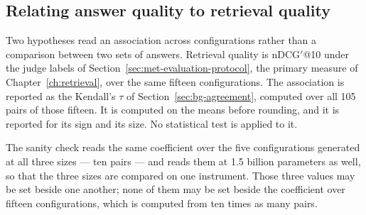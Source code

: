 \subsection*{Relating answer quality to retrieval quality}

Two hypotheses read an association across configurations rather than a comparison between two sets of
answers. Retrieval quality is nDCG$'$@10 under the judge labels of
Section~\ref{sec:met-evaluation-protocol}, the primary measure of Chapter~\ref{ch:retrieval}, over
the same fifteen configurations. The association is reported as the Kendall's $\tau$ of
Section~\ref{sec:bg-agreement}, computed over all 105 pairs of those fifteen. It is computed on the
means before rounding, and it is reported for its sign and its size. No statistical test is applied
to it.

The sanity check reads the same coefficient over the five configurations generated at all three sizes
--- ten pairs --- and reads them at 1.5 billion parameters as well, so that the three sizes are
compared on one instrument. Those three values may be set beside one another; none of them may be set
beside the coefficient over fifteen configurations, which is computed from ten times as many pairs.
